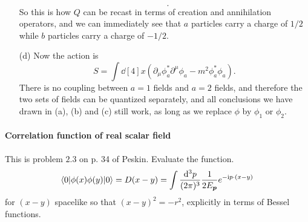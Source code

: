 \documentclass[hyperref, a4paper]{article}
\newcommand*{\ii}{\mathrm{i}}
\begin{document}
\begin{itemize}
\begin{equation}
\begin{aligned}
        \end{aligned}.
    \end{equation}
    So this is how $Q$ can be recast in terms of creation and annihilation operators, and we can immediately see that $a$ particles carry a charge of $1/2$ while $b$ particles carry a charge of $-1/2$.
    \item[(d)] Now the action is 
    \begin{equation}
        S = \int \dd[4]{x} (\partial_\mu \phi^*_a \partial^\mu \phi_a - m^2 \phi^*_a \phi_a).
    \end{equation} 
    There is no coupling between $a=1$ fields and $a=2$ fields, and therefore the two sets of fields can be quantized separately, and all conclusions we have drawn in (a), (b) and (c) still work, as long as we replace $\phi$ by $\phi_1$ or $\phi_2$.
\end{itemize}

\paragraph{}

\paragraph{Correlation function of real scalar field} This is problem $2.3$ on p. 34 of Peskin. Evaluate the function. 
\[
\langle 0|\phi(x) \phi(y)| 0\rangle=D(x-y)=\int \frac{\dd^{3} p}{(2 \pi)^{3}} \frac{1}{2 E_{\vb*{p}}} e^{-\ii p \cdot (x-y)}
\]
for $(x-y)$ spacelike so that $(x-y)^{2}=-r^{2}$, explicitly in terms of Bessel functions.
\end{document}
